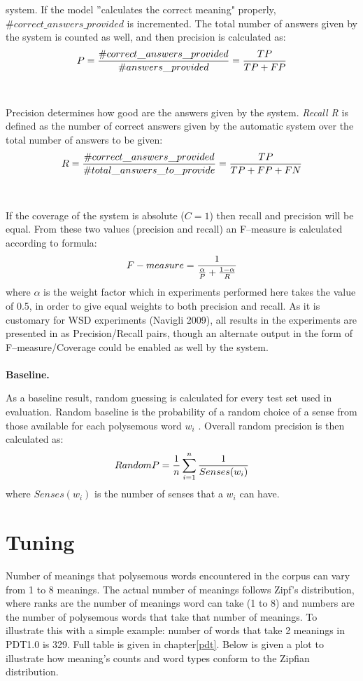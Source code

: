 system. If the model ''calculates the correct meaning" properly, 
\\$\#correct\_answers\_provided$ is 
incremented. The total number of answers given by the system is counted as well, and then precision 
is calculated as: 
\begin{equation}
\large{P=\frac{\#correct\_answers\_provided}{\#answers\_provided}=\frac{TP}{TP+FP}
}
\end{equation}
\\\\
Precision determines how good are the answers given by the system.
\textit{Recall R} is defined as the number of correct answers given by the automatic system
over the total number of answers to be given:
\begin{equation}
\large{
R=\frac{\#correct\_answers\_provided}{\#total\_answers\_to\_provide}=\frac{TP}{TP+FP+FN}
}
\end{equation}
\\\\
If the coverage of the system is absolute ($C=1$) then recall and precision will be equal. 
From these two values (precision and recall) an F--measure is calculated according to formula:
\begin{equation}
\large{
F-measure=\large{\frac{1}{\frac{\alpha}{P}+\frac{1-\alpha}{R}}}
}
\end{equation}
where $\alpha$ is the weight factor which in experiments performed here takes the value of 0.5, in order to give equal weights 
to both precision and recall. As it is customary for WSD experiments (Navigli 2009), all results in the experiments are presented in 
as Precision/Recall pairs, though an alternate output in the form of F--measure/Coverage could be enabled as well by the 
system.   
\\\\
\textbf{Baseline.}

As a baseline result, random guessing is calculated for every test set used in evaluation. Random baseline is the probability of a 
random choice of a sense from those available for each polysemous word $w_i$ . Overall random 
precision is then calculated as:
\begin{equation}
\large{
RandomP=\frac{1}{n} \sum_{i=1}^{n}\frac{1}{Senses(w_i)}
}
\end{equation}
where $Senses(w_i)$ is the number of senses that a $w_i$ can have. 

\section{Tuning}
Number of meanings that polysemous words encountered in the corpus can vary from 1 to 8 meanings. The actual number of meanings follows Zipf's distribution, where ranks are the number of meanings word 
can take (1 to 8) and numbers are the number of polysemous words that take that number of meanings. 
To illustrate this with a simple example: number of words that take 2 meanings in PDT1.0 is 329. 
Full table is given in chapter\ref{pdt}. Below is given a plot to illustrate how meaning's counts and word 
types conform to the Zipfian distribution.

